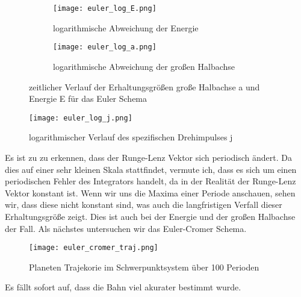 \documentclass[12pt]{article}
\begin{document}
\begin{figure}[H]
    \hspace*{-1.5cm}
    \begin{subfigure}{0.4\textwidth}
    \texttt{[image: euler\_log\_E.png]}
    \caption{logarithmische Abweichung der Energie}
    \end{subfigure}
    \hfill
    \begin{subfigure}{0.4\textwidth}
    \hspace*{-0.8cm}
    \texttt{[image: euler\_log\_a.png]}
    \caption{logarithmische Abweichung der großen Halbachse}
    \end{subfigure}
    \hfill
    \caption{zeitlicher Verlauf der Erhaltungsgrößen große Halbachse a und Energie E für das Euler Schema}\end{figure}
    \vspace*{-2cm}\begin{figure}[H]\centering\texttt{[image: euler\_log\_j.png]}\caption{logarithmischer Verlauf des spezifischen Drehimpulses j}\end{figure}
    Es ist zu zu erkennen, dass der Runge-Lenz Vektor sich periodisch ändert. Da dies auf einer sehr kleinen Skala stattfindet, vermute ich, dass es sich um einen periodischen Fehler des Integrators handelt, da in der Realität der Runge-Lenz Vektor konstant ist. Wenn wir uns die Maxima einer Periode anschauen, sehen wir, dass diese nicht konstant sind, was auch die langfristigen Verfall dieser Erhaltungsgröße zeigt. Dies ist auch bei der Energie und der großen Halbachse der Fall.\newline\newline
Als nächstes untersuchen wir das Euler-Cromer Schema.
\begin{figure}[H]\centering\texttt{[image: euler\_cromer\_traj.png]}\caption{Planeten Trajekorie im Schwerpunktsystem über 100 Perioden}\end{figure}
Es fällt sofort auf, dass die Bahn viel akurater bestimmt wurde. 
\end{document}
